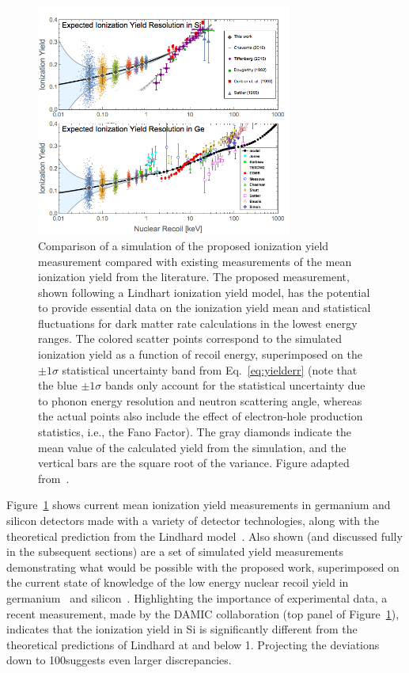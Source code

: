 \begin{figure}
\centering
\includegraphics[width=0.75\textwidth, trim={0 0 0 20}, clip]{Figures/Yield_Baseline_vs_Literature_SiGe}
\caption{Comparison of a simulation of the proposed ionization yield measurement compared with existing measurements of the mean ionization yield from the literature. The proposed measurement, shown following a Lindhart ionization yield model, has the potential to provide essential data on the ionization yield mean and statistical fluctuations for dark matter rate calculations in the lowest energy ranges. 
The colored scatter points correspond to the simulated ionization yield as a function of recoil energy, superimposed on the \(\pm1\sigma\) statistical uncertainty band from Eq.~\ref{eq:yielderr} (note that the blue \(\pm1\sigma\) bands only account for the statistical uncertainty due to phonon energy resolution and neutron scattering angle, whereas the actual points also include the effect of electron-hole production statistics, i.e., the Fano Factor). The gray diamonds indicate the mean value of the calculated yield from the simulation, and the vertical bars are the square root of the variance. Figure adapted from~\cite{2013APh....48....8B,1965PhRv..138.1815S,1990PhRvD..42.3211G}.
}
\label{fig:exp_vs_litt}
\end{figure}
Figure~\ref{fig:exp_vs_litt} shows current mean ionization yield measurements in germanium and silicon detectors made with a variety of detector technologies, along with the theoretical prediction from the Lindhard model~\cite{1964PhL....12..126L}. Also shown (and discussed fully in the subsequent sections) are a set of simulated yield measurements %
demonstrating what would be possible with the proposed work, superimposed on the current state of knowledge of the low energy nuclear recoil yield in germanium~\cite{2013APh....48....8B} and silicon~\cite{1965PhRv..138.1815S,1990PhRvD..42.3211G,1992PhRvA..45.2104D,Chavarria:2016arXiv}. Highlighting the importance of experimental data, a recent measurement, made by the DAMIC collaboration (top panel of Figure~\ref{fig:exp_vs_litt}), indicates that the ionization yield in Si is significantly different from the theoretical predictions of Lindhard at and below 1\keV.  Projecting the deviations down to 100\eV suggests even larger discrepancies.

